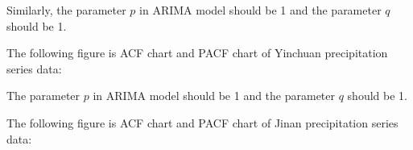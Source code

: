 \documentclass{swmcmthesis}
\begin{document}
\par 
Similarly, the parameter $p$ in ARIMA model should be 1 and the parameter $q$ should be 1.
\par
The following figure is ACF chart and PACF chart of Yinchuan precipitation series data:
\begin{figure}[h!t]
    \centering
    \hfill
\end{figure}
\par 
The parameter $p$ in ARIMA model should be 1 and the parameter $q$ should be 1.
\newpage
\par
The following figure is ACF chart and PACF chart of Jinan precipitation series data:
\begin{figure}[h!t]
    \centering
    \hfill
\end{figure}
\end{document}
